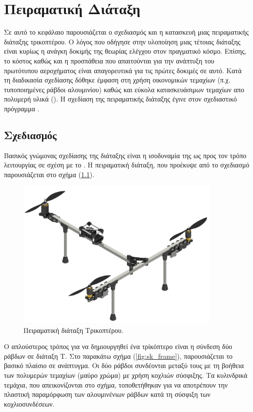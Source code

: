 \chapter{Πειραματική Διάταξη}

\noindent Σε αυτό το κεφάλαιο παρουσιάζεται ο σχεδιασμός και η κατασκευή μιας
πειραματικής διάταξης τρικοπτέρου. Ο λόγος που οδήγησε στην υλοποίηση μιας
τέτοιας διάταξης είναι κυρίως η ανάγκη δοκιμής της θεωρίας ελέγχου στον
πραγματικό κόσμο. Επίσης, το κόστος καθώς και η προσπάθεια που απαιτούνται για
την ανάπτυξη του πρωτότυπου αεροχήματος  είναι απαγορευτικά για τις
πρώτες δοκιμές σε αυτό. Κατά τη διαδικασία σχεδίασης δόθηκε έμφαση στη
χρήση οικονομικών τεμαχίων (π.χ. τυποποιημένες ράβδοι αλουμινίου) καθώς
και εύκολα κατασκευάσιμων τεμαχίων απο πολυμερή υλικά (). Η 
σχεδίαση της πειραματικής διάταξης έγινε στον σχεδιαστικό πρόγραμμα .

\section{Σχεδιασμός}
\noindent Βασικός γνώμονας σχεδίασης της διάταξης είναι η ισοδυναμία της ως προς
τον τρόπο λειτουργίας σε σχέση με το . Η πειραματική διάταξη, που
προέκυψε από το σχεδιασμό παρουσιάζεται στο σχήμα (\ref{fig:sk_assembly}).

\begin{figure}[H]
    \centering
    \includegraphics[width=0.9\textwidth]{Skoupa/Assembly_1_edit.png}
    \caption{Πειραματική διάταξη Τρικοπτέρου.}\label{fig:sk_assembly}
\end{figure}

Ο απλούστερος τρόπος για να δημιουργηθεί ένα τρίκόπτερο είναι η σύνδεση δύο
ράβδων σε διάταξη Τ. Στο παρακάτω σχήμα (\ref{fig:sk_frame}), 
παρουσιάζεται το βασικό πλαίσιο σε ανάπτυγμα. Οι δύο ράβδοι συνδέονται μεταξύ 
τους με τη βοήθεια των πολυμερών τεμαχίων (μαύρο χρώμα) με χρήση κοχλιών 
σύσφιξης. Τα κυλινδρικά τεμάχια, που απεικονίζονται στο σχήμα, τοποθετήθηκαν για 
να αποτρέπουν την πλαστική παραμόρφωση των αλουμινένιων ράβδων κατά τη σύσφιξη 
των κοχλιοσυνδέσεων.

